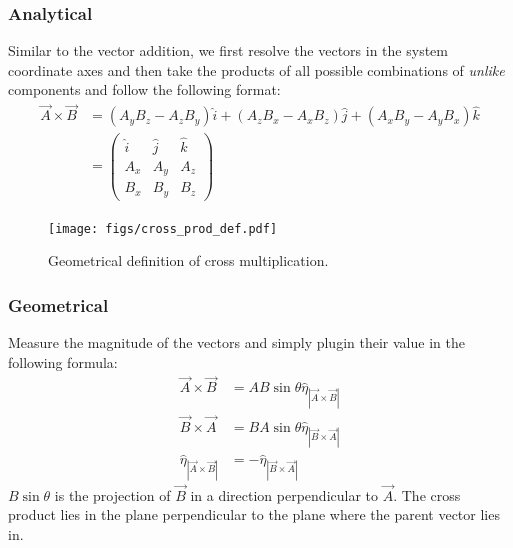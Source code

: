 \documentclass[12pt,b4paper]{article}
\begin{document}
\subsubsection*{Analytical} Similar to the vector addition, we first resolve the vectors in the system coordinate axes and then take the products of all possible combinations of \textit{unlike} components and follow the following format:
\begin{align}
    \Vec{A}\times\Vec{B}&=\left(A_yB_z-A_zB_y\right)\hat{i}+\left(A_zB_x-A_xB_z\right)\hat{j}+\left(A_xB_y-A_yB_x\right)\hat{k}\\[5pt]
    &=\begin{pmatrix}
        \hat{i} & \hat{j} & \hat{k} \\
        A_x & A_y & A_z \\
        B_x & B_y & B_z
    \end{pmatrix}
\end{align}
\begin{figure}[H]
    \centering
    \texttt{[image: figs/cross\_prod\_def.pdf]}
    \caption{Geometrical definition of cross multiplication.}
    \label{fig:cross_prod_def}
\end{figure}
\subsubsection*{Geometrical}
Measure the magnitude of the vectors and simply plugin their value in the following formula:
\begin{align}
    \Vec{A}\times\Vec{B}&=AB\sin{\theta}\hat{\eta}_{|\Vec{A}\times\Vec{B}|}\\
    \Vec{B}\times\Vec{A}&=BA\sin{\theta}\hat{\eta}_{|\Vec{B}\times\Vec{A}|}\\
    \hat{\eta}_{|\Vec{A}\times\Vec{B}|}&=-\hat{\eta}_{|\Vec{B}\times\Vec{A}|}
\end{align}
$B\sin{\theta}$ is the projection of $\Vec{B}$ in a direction perpendicular to $\Vec{A}$. The cross product lies in the plane perpendicular to the plane where the parent vector lies in.
\thispagestyle{empty}
\end{document}
